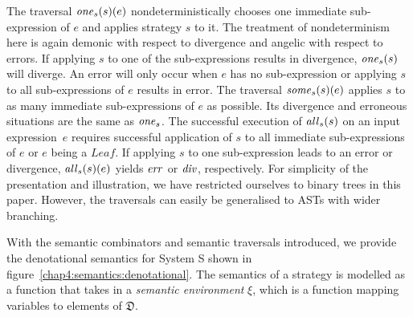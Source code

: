 The traversal $\text{\textit{one}\/}_{s}(s)(e)$ nondeterministically chooses one immediate sub-expression of $e$ and applies strategy $s$ to it. The treatment of nondeterminism here is again demonic with respect to divergence and angelic with respect to errors.
If applying $s$ to one of the sub-expressions results in divergence, $\text{\textit{one}\/}_{s}(s)$ will diverge. An error will only occur when $e$ has no sub-expression or applying $s$ to all sub-expressions of $e$ results in error.
The traversal $\text{\textit{some}\/}_{s}(s)(e)$ applies $s$ to as many immediate sub-expressions of $e$ as possible. Its divergence and erroneous situations are the same as $\text{\textit{one}\/}_{s}$.
The successful execution of $\text{\textit{all}\/}_{s}(s)$ on an input expression~$e$ requires successful application of $s$ to all immediate sub-expressions of $e$ or $e$ being a $\mathit{Leaf}$. If applying $s$ to one sub-expression leads to an error or divergence, $\text{\textit{all}\/}_{s}(s)(e)$ yields $\mathit{err}$ or $\mathit{div}$, respectively.
For simplicity of the presentation and illustration, we have restricted ourselves to binary trees in this paper. However, the traversals can easily be generalised to ASTs with wider branching.

With the semantic combinators and semantic traversals introduced, we provide the denotational semantics for System S shown in figure~\ref{chap4:semantics:denotational}. The semantics of a strategy is modelled as a function that takes in a \emph{semantic environment} $\xi$, which is a function mapping variables to elements of $\mathfrak{D}$.

